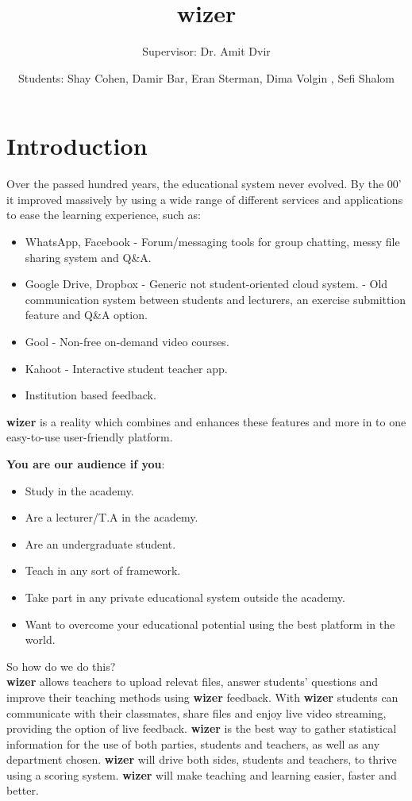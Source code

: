 \documentclass{article}
\title{wizer}
\author{Supervisor: Dr. Amit Dvir}
\author{Students: Shay Cohen, Damir Bar, Eran Sterman, Dima Volgin , Sefi Shalom}
\begin{document}
\maketitle

\section{Introduction}

Over the passed hundred years, the educational system never evolved. By the 00' it improved massively by using a wide range of different services and applications to ease the learning experience, such as: 
\begin{itemize}
\item WhatsApp, Facebook - Forum/messaging tools for group chatting, messy file sharing system and Q&A.
\item Google Drive, Dropbox - Generic not student-oriented cloud system.
\itemMoodle - Old communication system between students and lecturers, an exercise submittion feature and Q&A option.
\item Gool - Non-free on-demand video courses.
\item Kahoot - Interactive student teacher app.
\item Institution based feedback.
\end{itemize}
\textbf{wizer}  is a reality which combines and enhances these features and more in to one easy-to-use user-friendly platform.

\textbf{You are our audience if you}:
\begin{itemize}
\item Study in the academy.
\item Are a lecturer/T.A in the academy.
\item Are an undergraduate student.
\item Teach in any sort of framework.  
\item Take part in any private educational system outside the academy.
\item Want to overcome your educational potential using the best platform in the world.
\end{itemize}
So how do we do this?\\
\textbf{wizer}  allows teachers to upload relevat files, answer students' questions  and improve their teaching methods using \textbf{wizer}  feedback. With \textbf{wizer}  students can communicate with their classmates, share files and enjoy live video streaming, providing the option of live feedback. \textbf{wizer}  is the best way to gather statistical information for the use of both parties, students and teachers, as well as any department chosen. \textbf{wizer}  will drive both sides, students and teachers, to thrive using a scoring system. \textbf{wizer}  will make teaching and learning easier, faster and better.
\end{document}
